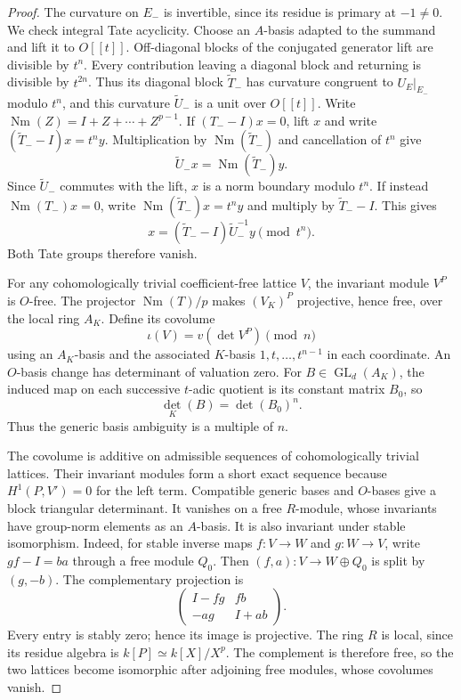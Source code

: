 \begin{proof}
The curvature on \(E_-\) is invertible, since its residue is
primary at \(-1\ne0\).  We check integral Tate acyclicity.
Choose an \(A\)-basis adapted to the summand and lift it to
\(O[[t]]\).  Off-diagonal blocks of the conjugated generator
lift are divisible by \(t^n\).  Every contribution leaving a
diagonal block and returning is divisible by \(t^{2n}\).
Thus its diagonal block \(\widetilde T_-\) has curvature
congruent to \(U_E|_{E_-}\) modulo \(t^n\), and this curvature
\(\widetilde U_-\) is a unit over \(O[[t]]\).
Write \(\operatorname{Nm}(Z)=I+Z+\cdots+Z^{p-1}\).
If \((T_--I)x=0\), lift \(x\) and write
\((\widetilde T_--I)x=t^ny\).  Multiplication by
\(\operatorname{Nm}(\widetilde T_-)\) and cancellation of \(t^n\)
give
\[
 \widetilde U_-x=\operatorname{Nm}(\widetilde T_-)y.
\]
Since \(\widetilde U_-\) commutes with the lift, \(x\) is a norm
boundary modulo \(t^n\).
If instead \(\operatorname{Nm}(T_-)x=0\), write
\(\operatorname{Nm}(\widetilde T_-)x=t^ny\) and multiply by
\(\widetilde T_--I\).  This gives
\[
 x=(\widetilde T_--I)\widetilde U_-^{-1}y
 \pmod{t^n}.
\]
Both Tate groups therefore vanish.

For any cohomologically trivial coefficient-free lattice \(V\),
the invariant module \(V^P\) is \(O\)-free.  The projector
\(\operatorname{Nm}(T)/p\) makes \((V_K)^P\) projective, hence
free, over the local ring \(A_K\).  Define its covolume
\[
 \iota(V)=v(\det V^P)\pmod n
\]
using an \(A_K\)-basis and the associated \(K\)-basis
\(1,t,\ldots,t^{n-1}\) in each coordinate.
An \(O\)-basis change has determinant of valuation zero.
For \(B\in\operatorname{GL}_d(A_K)\), the induced map on each
successive \(t\)-adic quotient is its constant matrix \(B_0\),
so
\[
 \det_K(B)=\det(B_0)^n.
\]
Thus the generic basis ambiguity is a multiple of \(n\).

The covolume is additive on admissible sequences of
cohomologically trivial lattices.  Their invariant modules
form a short exact sequence because \(H^1(P,V')=0\) for the
left term.  Compatible generic bases and \(O\)-bases give a
block triangular determinant.  It vanishes on a free \(R\)-module,
whose invariants have group-norm elements as an \(A\)-basis.
It is also invariant under stable isomorphism.
Indeed, for stable inverse maps \(f:V\to W\) and \(g:W\to V\),
write \(gf-I=ba\) through a free module \(Q_0\).
Then \((f,a):V\to W\oplus Q_0\) is split by \((g,-b)\).
The complementary projection is
\[
 \begin{pmatrix}I-fg&fb\\-ag&I+ab\end{pmatrix}.
\]
Every entry is stably zero; hence its image is projective.
The ring \(R\) is local, since its residue algebra is
\(k[P]\simeq k[X]/X^p\).  The complement is therefore free,
so the two lattices become isomorphic after adjoining free
modules, whose covolumes vanish.


\end{proof}
